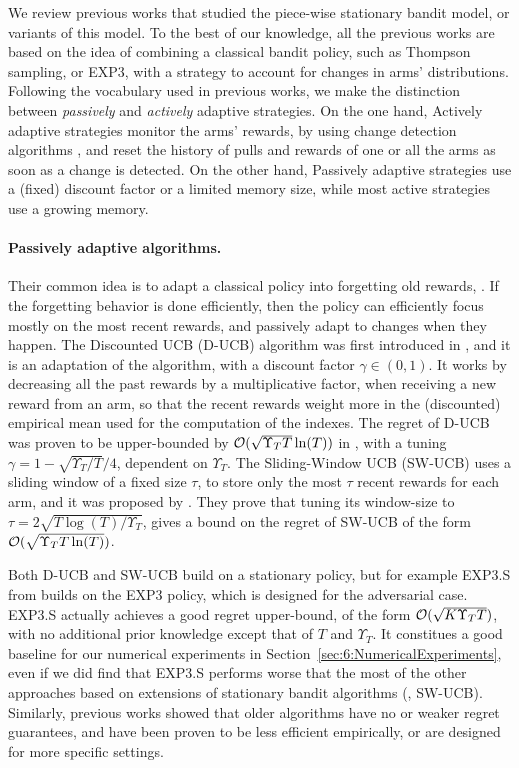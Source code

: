 We review previous works that studied the piece-wise stationary bandit model, or variants of this model.
To the best of our knowledge, all the previous works are based on the idea of combining a classical bandit policy, such as Thompson sampling, \UCB{} or EXP3, with a strategy to account for changes in arms' distributions.
Following the vocabulary used in previous works, we make the distinction between \emph{passively} and \emph{actively} adaptive strategies.
On the one hand, Actively adaptive strategies monitor the arms' rewards, by using change detection algorithms \cite{Basseville93}, and reset the history of pulls and rewards of one or all the arms as soon as a change is detected.
On the other hand, Passively adaptive strategies use a (fixed) discount factor or a limited memory size, while most active strategies use a growing memory.


\paragraph{Passively adaptive algorithms.}
%
Their common idea is to adapt a classical policy into forgetting old rewards, .
If the forgetting behavior is done efficiently, then the policy can efficiently focus mostly on the most recent rewards, and passively adapt to changes when they happen.
%
The Discounted UCB (D-UCB) algorithm was first introduced in \cite{Kocsis06}, and it is an adaptation of the \UCB{} algorithm, with a discount factor $\gamma\in(0,1)$. It works by decreasing all the past rewards by a multiplicative factor, when receiving a new reward from an arm, so that the recent rewards weight more in the (discounted) empirical mean used for the computation of the \UCB{} indexes.
The regret of D-UCB was proven to be upper-bounded by $\mathcal{O}(\sqrt{\Upsilon_T T }\ln(T))$ in \cite{Garivier11UCBDiscount}, with a tuning $\gamma = 1 - \sqrt{\Upsilon_T/T}/4$, dependent on $\Upsilon_T$.
%
The Sliding-Window UCB (SW-UCB) uses a sliding window of a fixed size $\tau$, to store only the most $\tau$ recent rewards for each arm,
and it was proposed by \cite{Garivier11UCBDiscount}.
They prove that tuning its window-size to $\tau = 2 \sqrt{T\log(T)/\Upsilon_T}$, gives a bound on the regret of SW-UCB of the form $\mathcal{O}(\sqrt{\Upsilon_T T \ln(T)})$.

Both D-UCB and SW-UCB build on a stationary policy, but for example EXP3.S from \cite{Auer02NonStochastic}
builds on the EXP3 policy, which is designed for the adversarial case.
EXP3.S actually achieves a good regret upper-bound, of the form $\mathcal{O}(\sqrt{K \Upsilon_T T})$, with no additional prior knowledge except that of $T$ and $\Upsilon_T$.
It constitues a good baseline for our numerical experiments in Section~\ref{sec:6:NumericalExperiments},
even if we did find that EXP3.S performs worse that the most of the other approaches based on extensions of stationary bandit algorithms (\eg, SW-UCB).
Similarly, previous works showed that older algorithms have no or weaker regret guarantees, and have been proven to be less efficient empirically, or are designed for more specific settings.


